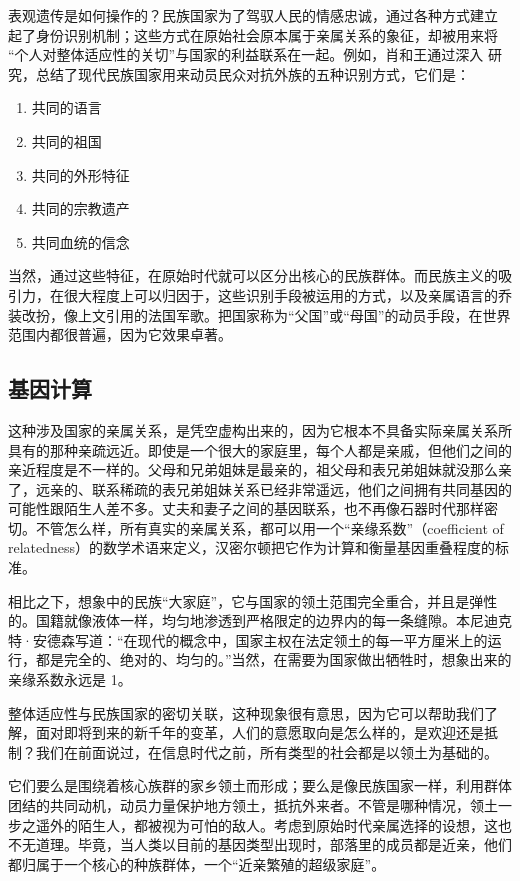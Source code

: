 表观遗传是如何操作的？民族国家为了驾驭人民的情感忠诚，通过各种方式建立 起了身份识别机制；这些方式在原始社会原本属于亲属关系的象征，却被用来将 “个人对整体适应性的关切”与国家的利益联系在一起。例如，肖和王通过深入 研究，总结了现代民族国家用来动员民众对抗外族的五种识别方式，它们是：
\begin{enumerate}
    \item 共同的语言
    \item 共同的祖国
    \item 共同的外形特征
    \item 共同的宗教遗产
    \item 共同血统的信念
\end{enumerate}

当然，通过这些特征，在原始时代就可以区分出核心的民族群体。而民族主义的吸引力，在很大程度上可以归因于，这些识别手段被运用的方式，以及亲属语言的乔装改扮，像上文引用的法国军歌。把国家称为“父国”或“母国”的动员手段，在世界范围内都很普遍，因为它效果卓著。

\subsection{基因计算}
这种涉及国家的亲属关系，是凭空虚构出来的，因为它根本不具备实际亲属关系所具有的那种亲疏远近。即使是一个很大的家庭里，每个人都是亲戚，但他们之间的亲近程度是不一样的。父母和兄弟姐妹是最亲的，祖父母和表兄弟姐妹就没那么亲了，远亲的、联系稀疏的表兄弟姐妹关系已经非常遥远，他们之间拥有共同基因的可能性跟陌生人差不多。丈夫和妻子之间的基因联系，也不再像石器时代那样密切。不管怎么样，所有真实的亲属关系，都可以用一个“亲缘系数”（coefficient of relatedness）的数学术语来定义，汉密尔顿把它作为计算和衡量基因重叠程度的标准。

相比之下，想象中的民族“大家庭”，它与国家的领土范围完全重合，并且是弹性的。国籍就像液体一样，均匀地渗透到严格限定的边界内的每一条缝隙。本尼迪克特·安德森写道：“在现代的概念中，国家主权在法定领土的每一平方厘米上的运行，都是完全的、绝对的、均匀的。”当然，在需要为国家做出牺牲时，想象出来的亲缘系数永远是 1。

整体适应性与民族国家的密切关联，这种现象很有意思，因为它可以帮助我们了解，面对即将到来的新千年的变革，人们的意愿取向是怎么样的，是欢迎还是抵制？我们在前面说过，在信息时代之前，所有类型的社会都是以领土为基础的。

它们要么是围绕着核心族群的家乡领土而形成；要么是像民族国家一样，利用群体团结的共同动机，动员力量保护地方领土，抵抗外来者。不管是哪种情况，领土一步之遥外的陌生人，都被视为可怕的敌人。考虑到原始时代亲属选择的设想，这也不无道理。毕竟，当人类以目前的基因类型出现时，部落里的成员都是近亲，他们都归属于一个核心的种族群体，一个“近亲繁殖的超级家庭”。

